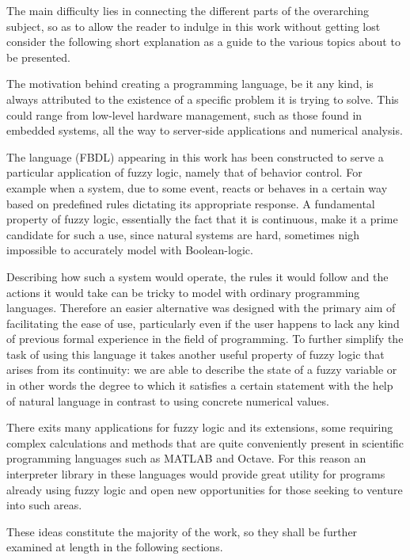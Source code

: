 The main difficulty lies in connecting the different parts of the overarching subject, so as to allow the reader to indulge in this work without getting lost consider the following short explanation as a guide to the various topics about to be presented.

The motivation behind creating a programming language, be it any kind, is always attributed to the existence of a specific problem it is trying to solve. This could range from low-level hardware management, such as those found in embedded systems, all the way to server-side applications and numerical analysis.

The language (FBDL) appearing in this work has been constructed to serve a particular application of fuzzy logic, namely that of behavior control. For example when a system, due to some event, reacts or behaves in a certain way based on predefined rules dictating its appropriate response. A fundamental property of fuzzy logic, essentially the fact that it is continuous, make it a prime candidate for such a use, since natural systems are hard, sometimes nigh impossible to accurately model with Boolean-logic.

Describing how such a system would operate, the rules it would follow and the actions it would take can be tricky to model with ordinary programming languages. Therefore an easier alternative was designed with the primary aim of facilitating the ease of use, particularly even if the user happens to lack any kind of previous formal experience in the field of programming. To further simplify the task of using this language it takes another useful property of fuzzy logic that arises from its continuity: we are able to describe the state of a fuzzy variable or in other words the degree to which it satisfies a certain statement with the help of natural language in contrast to using concrete numerical values.

There exits many applications for fuzzy logic and its extensions, some requiring complex calculations and methods that are quite conveniently present in scientific programming languages such as MATLAB and Octave. For this reason an interpreter library in these languages would provide great utility for programs already using fuzzy logic and open new opportunities for those seeking to venture into such areas.

These ideas constitute the majority of the work, so they shall be further examined at length in the following sections.
